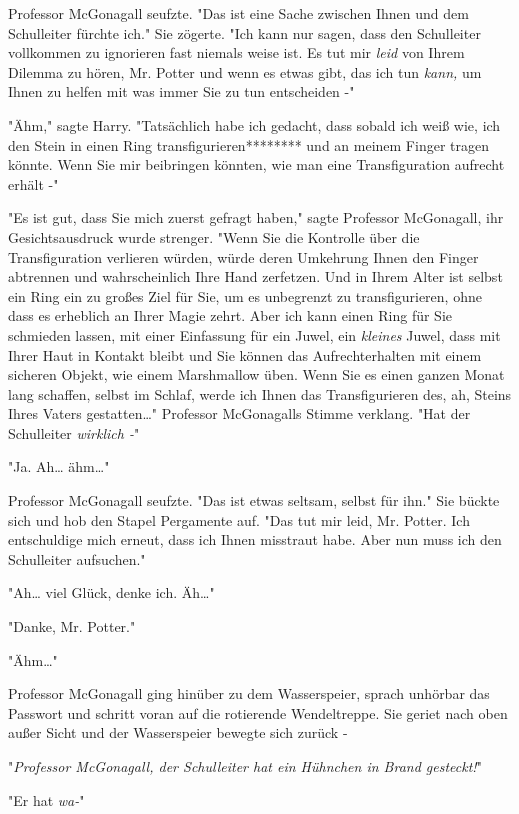{Professor McGonagall seufzte. "Das ist eine Sache zwischen Ihnen und dem Schulleiter fürchte ich." Sie zögerte. "Ich kann nur sagen, dass den Schulleiter vollkommen zu ignorieren fast niemals weise ist. Es tut mir \emph{leid} von Ihrem Dilemma zu hören, Mr. Potter und wenn es etwas gibt, das ich tun \emph{kann,} um Ihnen zu helfen mit was immer Sie zu tun entscheiden -"

"Ähm," sagte Harry. "Tatsächlich habe ich gedacht, dass sobald ich weiß wie, ich den Stein in einen Ring transfigurieren******** und an meinem Finger tragen könnte. Wenn Sie mir beibringen könnten, wie man eine Transfiguration aufrecht erhält -"

"Es ist gut, dass Sie mich zuerst gefragt haben," sagte Professor McGonagall, ihr Gesichtsausdruck wurde strenger. "Wenn Sie die Kontrolle über die Transfiguration verlieren würden, würde deren Umkehrung Ihnen den Finger abtrennen und wahrscheinlich Ihre Hand zerfetzen. Und in Ihrem Alter ist selbst ein Ring ein zu großes Ziel für Sie, um es unbegrenzt zu transfigurieren, ohne dass es erheblich an Ihrer Magie zehrt. Aber ich kann einen Ring für Sie schmieden lassen, mit einer Einfassung für ein Juwel, ein \emph{kleines} Juwel, dass mit Ihrer Haut in Kontakt bleibt und Sie können das Aufrechterhalten mit einem sicheren Objekt, wie einem Marshmallow üben. Wenn Sie es einen ganzen Monat lang schaffen, selbst im Schlaf, werde ich Ihnen das Transfigurieren des, ah, Steins Ihres Vaters gestatten…" Professor McGonagalls Stimme verklang. "Hat der Schulleiter \emph{wirklich -}"

"Ja. Ah… ähm…"

Professor McGonagall seufzte. "Das ist etwas seltsam, selbst für ihn." Sie bückte sich und hob den Stapel Pergamente auf. "Das tut mir leid, Mr. Potter. Ich entschuldige mich erneut, dass ich Ihnen misstraut habe. Aber nun muss ich den Schulleiter aufsuchen."

"Ah… viel Glück, denke ich. Äh…"

"Danke, Mr. Potter."

"Ähm…"

Professor McGonagall ging hinüber zu dem Wasserspeier, sprach unhörbar das Passwort und schritt voran auf die rotierende Wendeltreppe. Sie geriet nach oben außer Sicht und der Wasserspeier bewegte sich zurück -

"\emph{Professor McGonagall, der Schulleiter hat ein Hühnchen in Brand gesteckt!}"

"Er hat \emph{wa-}"

}
